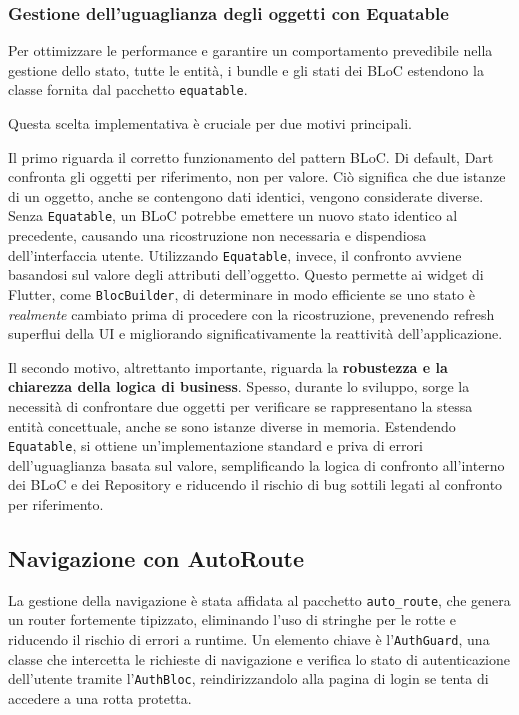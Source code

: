 \subsubsection{Gestione dell'uguaglianza degli oggetti con Equatable}
Per ottimizzare le performance e garantire un comportamento prevedibile nella gestione dello stato, tutte le entità, i bundle e gli stati dei BLoC estendono la classe fornita dal pacchetto \texttt{equatable}.

Questa scelta implementativa è cruciale per due motivi principali.

Il primo riguarda il corretto funzionamento del pattern BLoC. Di default, Dart confronta gli oggetti per riferimento, non per valore.
Ciò significa che due istanze di un oggetto, anche se contengono dati identici, vengono considerate diverse.
Senza \texttt{Equatable}, un BLoC potrebbe emettere un nuovo stato identico al precedente, causando una ricostruzione non necessaria e dispendiosa dell'interfaccia utente.
Utilizzando \texttt{Equatable}, invece, il confronto avviene basandosi sul valore degli attributi dell'oggetto.
Questo permette ai widget di Flutter, come \texttt{BlocBuilder}, di determinare in modo efficiente se uno stato è \emph{realmente} cambiato prima di procedere con la ricostruzione, prevenendo refresh superflui della UI e migliorando significativamente la reattività dell'applicazione.

Il secondo motivo, altrettanto importante, riguarda la \textbf{robustezza e la chiarezza della logica di business}.
Spesso, durante lo sviluppo, sorge la necessità di confrontare due oggetti per verificare se rappresentano la stessa entità concettuale, anche se sono istanze diverse in memoria.
Estendendo \texttt{Equatable}, si ottiene un'implementazione standard e priva di errori dell'uguaglianza basata sul valore, semplificando la logica di confronto all'interno dei BLoC e dei Repository e riducendo il rischio di bug sottili legati al confronto per riferimento.

\subsection{Navigazione con AutoRoute}\label{subsec:navigazione-con-autoroute}
La gestione della navigazione è stata affidata al pacchetto \texttt{auto\_route}, che genera un router fortemente tipizzato, eliminando l'uso di stringhe per le rotte e riducendo il rischio di errori a runtime.
Un elemento chiave è l'\texttt{AuthGuard}, una classe che intercetta le richieste di navigazione e verifica lo stato di autenticazione dell'utente tramite l'\texttt{AuthBloc}, reindirizzandolo alla pagina di login se tenta di accedere a una rotta protetta.

